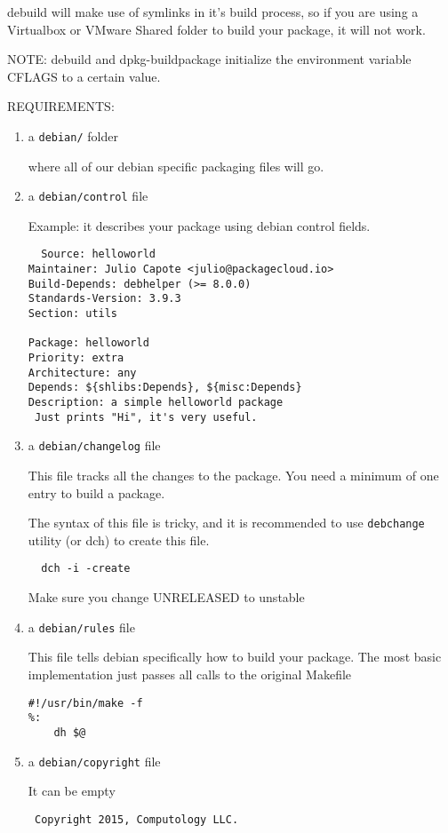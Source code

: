 debuild will make use of symlinks in it's build process, so if you are using a
Virtualbox or VMware Shared folder to build your package, it will not work.

NOTE: debuild and dpkg-buildpackage initialize the environment variable  CFLAGS to a
certain value.

REQUIREMENTS:
\begin{enumerate}
  \item a \verb!debian/! folder
  
  where all of our debian specific packaging files will go.
  
  \item a \verb!debian/control! file
  
  Example: it describes your package using debian control fields. 
  \begin{verbatim}
  Source: helloworld  
Maintainer: Julio Capote <julio@packagecloud.io>
Build-Depends: debhelper (>= 8.0.0)
Standards-Version: 3.9.3
Section: utils

Package: helloworld  
Priority: extra  
Architecture: any
Depends: ${shlibs:Depends}, ${misc:Depends}  
Description: a simple helloworld package
 Just prints "Hi", it's very useful.
  \end{verbatim}
  
  \item a \verb!debian/changelog! file
  
  This file tracks all the changes to the package. You need a minimum of one
  entry to build a package.
  
  The syntax of this file is tricky, and it is recommended to use
  \verb!debchange! utility (or dch) to create this file.
  \begin{verbatim}
  dch -i -create
  \end{verbatim}
  
  Make sure you change UNRELEASED to unstable
  
  \item a \verb!debian/rules! file
  
  This file tells debian specifically how to build your package. The most basic
    implementation just passes all calls to the original Makefile
   
\begin{verbatim}
#!/usr/bin/make -f  
%:  
	dh $@
\end{verbatim} 
    
    \item a \verb!debian/copyright! file
    
 It can be empty
 \begin{verbatim}
 Copyright 2015, Computology LLC.
 \end{verbatim}
\end{enumerate}


